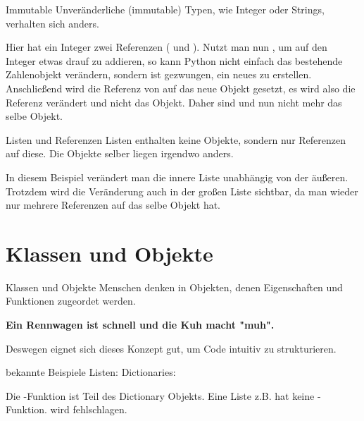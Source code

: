 \begin{frame}{Immutable}
	Unveränderliche (immutable) Typen, wie Integer oder Strings, verhalten sich anders.
	
	Hier hat ein Integer zwei Referenzen ( und ). Nutzt man nun , um auf den Integer etwas drauf zu addieren, so kann Python nicht einfach das bestehende Zahlenobjekt verändern, sondern ist gezwungen, ein neues zu erstellen. Anschließend wird die Referenz von  auf das neue Objekt gesetzt, es wird also die Referenz verändert und nicht das Objekt. Daher sind  und  nun nicht mehr das selbe Objekt.
\end{frame}

\begin{frame}{Listen und Referenzen}
	Listen enthalten keine Objekte, sondern nur Referenzen auf diese. Die Objekte selber liegen irgendwo anders.
	
	In diesem Beispiel verändert man die innere Liste unabhängig von der äußeren. Trotzdem wird die Veränderung auch in der großen Liste sichtbar, da man wieder nur mehrere Referenzen auf das selbe Objekt hat.
\end{frame}

\section{Klassen und Objekte}
\begin{frame}{Klassen und Objekte}
	Menschen denken in Objekten, denen Eigenschaften und Funktionen zugeordet werden. \linebreak
	\begin{center}
		 \textbf{Ein Rennwagen ist schnell und die Kuh macht "muh".} \linebreak
	\end{center}
	Deswegen eignet sich dieses Konzept gut, um Code intuitiv zu strukturieren.
\end{frame}
\begin{frame}{bekannte Beispiele}
	Listen: 
	\linebreak
	Dictionaries: 
	\linebreak
	
	Die -Funktion ist Teil des Dictionary Objekts. Eine Liste z.B. hat keine -Funktion. 
	\linebreak\linebreak
	 wird fehlschlagen.	
\end{frame}

